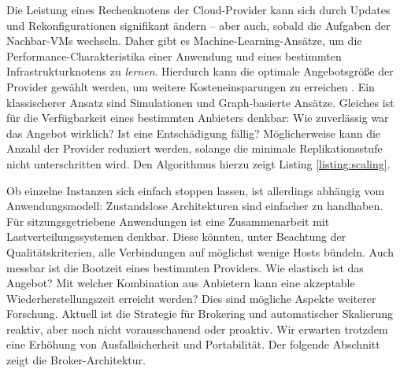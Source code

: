 Die Leistung eines Rechenknotens der Cloud-Provider kann sich durch Updates und Rekonfigurationen signifikant ändern -- aber auch, sobald die Aufgaben der Nachbar-VMs wechseln. Daher gibt es Machine-Learning-Ansätze, um die Performance-Charakteristika einer Anwendung und eines bestimmten Infrastrukturknotens zu \emph{lernen}. Hierdurch kann die optimale Angebotsgröße der Provider gewählt werden, um weitere Kosteneinsparungen zu erreichen \cite{grozev:2016:ml-brokering}. Ein klassischerer Ansatz sind Simulationen und Graph-basierte Ansätze. Gleiches ist für die Verfügbarkeit eines bestimmten Anbieters denkbar: Wie zuverlässig war das Angebot wirklich? Ist eine Entschädigung fällig? Möglicherweise kann die Anzahl der Provider reduziert werden, solange die minimale Replikationsstufe nicht unterschritten wird. Den Algorithmus hierzu zeigt Listing \ref{listing:scaling}.

Ob einzelne Instanzen sich einfach stoppen lassen, ist allerdings abhängig vom Anwendungsmodell: Zustandslose Architekturen sind einfacher zu handhaben. Für sitzungsgetriebene Anwendungen ist eine Zusammenarbeit mit Lastverteilungssystemen denkbar. Diese könnten, unter Beachtung der Qualitätskriterien, alle Verbindungen auf möglichst wenige Hosts bündeln. Auch messbar ist die Bootzeit eines bestimmten Providers. Wie elastisch ist das Angebot? Mit welcher Kombination aus Anbietern kann eine akzeptable Wiederherstellungszeit erreicht werden? Dies sind mögliche Aspekte weiterer Forschung. Aktuell ist die Strategie für Brokering und automatischer Skalierung reaktiv, aber noch nicht vorausschauend oder proaktiv. Wir erwarten trotzdem eine Erhöhung von Ausfallsicherheit und Portabilität. Der folgende Abschnitt zeigt die Broker-Architektur.
